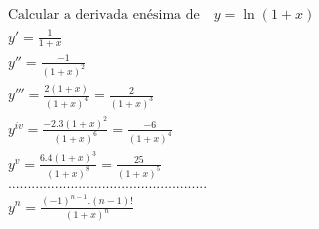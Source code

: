 \begin{ex}
\begin{align}
&\text{Calcular a derivada enésima de}\quad y=\ln{(1+x)}\nonumber\\
&y'=\frac{1}{1+x}\nonumber\\
&y''=\frac{-1}{(1+x)^2}\nonumber\\
&y'''=\frac{2(1+x)}{(1+x)^4}=\frac{2}{(1+x)^3}\nonumber\\
&y^{iv}=\frac{-2.3(1+x)^2}{(1+x)^6}=\frac{-6}{(1+x)^4}\nonumber\\
&y^{v}=\frac{6.4(1+x)^3}{(1+x)^8}=\frac{25}{(1+x)^5}\nonumber\\
&...................................................\nonumber\\
&y^{n}=\frac{(-1)^{n-1}.(n-1)!}{(1+x)^n}\nonumber
\end{align}
\end{ex}